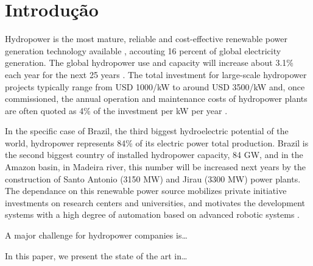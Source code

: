 \section{Introdução}
Hydropower is the most mature, reliable and cost-effective
renewable power generation technology available \citep{brown}, accouting 16
percent of global electricity generation. The global hydropower use and
capacity will increase about 3.1\% each year for the next 25 years \citep{wi}.
The total investment for large-scale hydropower projects
typically range from USD 1000/kW to around USD 3500/kW and, once commissioned,
the annual operation and maintenance costs of hydropower plants are often
quoted as 4\% of the investment per kW per year \citep{ecofys}. 

In the specific case of Brazil, the third biggest hydroelectric potential of
the world, hydropower represents 84\% of its electric power total production.
Brazil is the second biggest country of installed hydropower capacity, 84 GW,
and in the Amazon basin, in Madeira river, this number will be increased next
years by the construction of Santo Antonio (3150 MW) and Jirau (3300 MW) power
plants. The dependance on this renewable power source mobilizes private
initiative investments on research centers and universities, and motivates the
development systems with a high degree of automation based on advanced robotic
systems \citep{aneel}.

A major challenge for hydropower companies is\ldots


 


In this paper, we present the state of the art in\ldots


